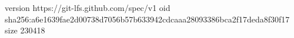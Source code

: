 version https://git-lfs.github.com/spec/v1
oid sha256:a6e1639fae2d00738d7056b57b633942cdcaaa28093386bca2f17deda8f30f17
size 230418
